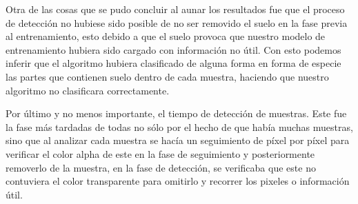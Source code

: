 Otra de las cosas que se pudo concluir al aunar los resultados fue que el proceso de detección no hubiese sido posible de no ser removido el suelo en la fase previa al entrenamiento, esto debido a que el suelo provoca que nuestro modelo de entrenamiento hubiera sido cargado con información no útil. Con esto podemos inferir que el algoritmo hubiera clasificado de alguna forma en forma de especie las partes que contienen suelo dentro de cada muestra, haciendo que nuestro algoritmo no clasificara correctamente.

Por último y no menos importante, el tiempo de detección de muestras. Este fue la fase más tardadas de todas no sólo por el hecho de que había muchas muestras, sino que al analizar cada muestra se hacía un seguimiento de píxel por píxel para verificar el color alpha de este en la fase de seguimiento y posteriormente removerlo de la muestra, en la fase de detección, se verificaba que este no contuviera el color transparente para omitirlo y recorrer los pixeles o información útil.
